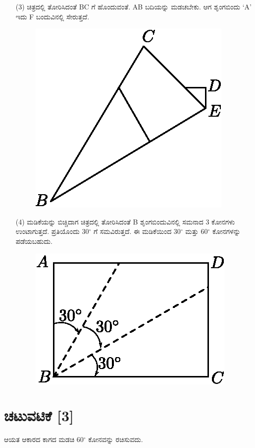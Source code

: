 \begin{enumerate}
\item[(3)] ಚಿತ್ರದಲ್ಲಿ ತೋರಿಸಿದಂತೆ  BC ಗೆ ಹೊಂದುವಂತೆ.  AB ಬದಿಯನ್ನು ಮಡಚಬೇಕು.  ಆಗ ಶೃಂಗಬಿಂದು `A' ಇದು  F ಬಂದುವಿನಲ್ಲಿ ಸೇರುತ್ತದೆ. 
\begin{figure}[H]
\centering
\includegraphics[scale=.98]{src/figure/chap1/fig1-8c.eps}
\end{figure}

\item[(4)] ಮಡಿಕೆಯನ್ನು ಬಿಚ್ಚಿದಾಗ ಚಿತ್ರದಲ್ಲಿ ತೋರಿಸಿದಂತೆ B ಶೃಂಗಬಿಂದುವಿನಲ್ಲಿ ಸಮನಾದ  3 ಕೋನಗಳು ಉಂಟಾಗುತ್ತದೆ. ಪ್ರತಿಯೊಂದು 30$^\circ$ ಗೆ ಸಮವಿರುತ್ತದೆ. ಈ ಮಡಿಕೆಯಿಂದ 30$^\circ$ ಮತ್ತು 60$^\circ$ ಕೋನಗಳನ್ನು ಪಡೆಯಬಹುದು. 
\begin{figure}[H]
\centering
\includegraphics[scale=.98]{src/figure/chap1/fig1-8d.eps}
\end{figure}
\end{enumerate}

\section*{ಚಟುವಟಿಕೆ [3]} ಆಯತ ಆಕಾರದ ಕಾಗದ ಮಡಚಿ 60$^\circ$ ಕೋನವನ್ನು ರಚಿಸುವದು. 

